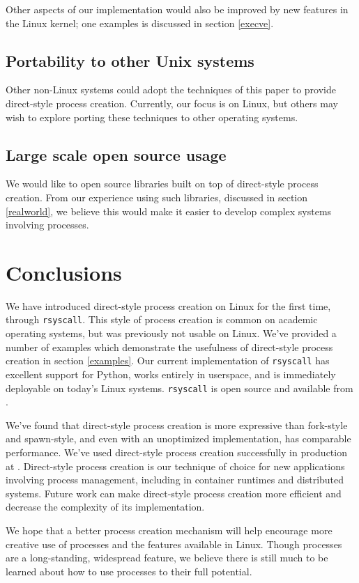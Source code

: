 \documentclass[letterpaper,twocolumn,10pt]{article}
\begin{document}
Other aspects of our implementation would also be improved by new features in the Linux kernel;
one examples is discussed in section \ref{execve}.
\subsection{Portability to other Unix systems}
Other non-Linux systems
could adopt the techniques of this paper
to provide direct-style process creation.
Currently, our focus is on Linux,
but others may wish to explore porting these techniques to other operating systems.
\subsection{Large scale open source usage}
We would like to open source libraries built on top of direct-style process creation.
From our experience using such libraries, discussed in section \ref{realworld},
we believe this would make it easier to develop complex systems involving processes.
\section{Conclusions}\label{conclusions}
We have introduced direct-style process creation on Linux for the first time,
through \texttt{rsyscall}.
This style of process creation is common on academic operating systems,
but was previously not usable on Linux.
We've provided a number of examples which demonstrate the usefulness
of direct-style process creation in section \ref{examples}.
Our current implementation of \texttt{rsyscall} has excellent support for Python,
works entirely in userspace,
and is immediately deployable on today's Linux systems.
\texttt{rsyscall} is open source and available from \githuburl{}.

We've found that direct-style process creation is more expressive than fork-style and spawn-style,
and even with an unoptimized implementation, has comparable performance.
We've used direct-style process creation successfully in production at \twosigma{}.
Direct-style process creation is our technique of choice for new applications involving process management,
including in container runtimes and distributed systems.
Future work can make direct-style process creation more efficient
and decrease the complexity of its implementation.

We hope that a better process creation mechanism
will help encourage more creative use of processes and the features available in Linux.
Though processes are a long-standing, widespread feature,
we believe there is still much to be learned about how to use processes to their full potential.


\end{document}
